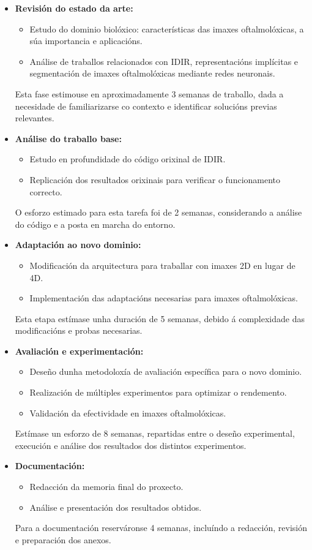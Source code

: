 \begin{itemize}
    \item \textbf{Revisión do estado da arte:}
    \begin{itemize}
        \item Estudo do dominio biolóxico: características das imaxes oftalmolóxicas, a súa importancia e aplicacións.
        \item Análise de traballos relacionados con IDIR, representacións implícitas e segmentación de imaxes oftalmolóxicas mediante redes neuronais.
    \end{itemize}
    Esta fase estimouse en aproximadamente 3 semanas de traballo, dada a necesidade de familiarizarse co contexto e identificar solucións previas relevantes.

    \item \textbf{Análise do traballo base:}
    \begin{itemize}
        \item Estudo en profundidade do código orixinal de IDIR.
        \item Replicación dos resultados orixinais para verificar o funcionamento correcto.
    \end{itemize}
    O esforzo estimado para esta tarefa foi de 2 semanas, considerando a análise do código e a posta en marcha do entorno.

    \item \textbf{Adaptación ao novo dominio:}
    \begin{itemize}
        \item Modificación da arquitectura para traballar con imaxes 2D en lugar de 4D.
        \item Implementación das adaptacións necesarias para imaxes oftalmolóxicas.
    \end{itemize}
    Esta etapa estímase unha duración de 5 semanas, debido á complexidade das modificacións e probas necesarias.

    \item \textbf{Avaliación e experimentación:}
    \begin{itemize}
        \item Deseño dunha metodoloxía de avaliación específica para o novo dominio.
        \item Realización de múltiples experimentos para optimizar o rendemento.
        \item Validación da efectividade en imaxes oftalmolóxicas.
    \end{itemize}
    Estímase un esforzo de 8 semanas, repartidas entre o deseño experimental, execución e análise dos resultados dos distintos experimentos.

    \item \textbf{Documentación:}
    \begin{itemize}
        \item Redacción da memoria final do proxecto.
        \item Análise e presentación dos resultados obtidos.
    \end{itemize}
    Para a documentación reserváronse 4 semanas, incluíndo a redacción, revisión e preparación dos anexos.
\end{itemize}

